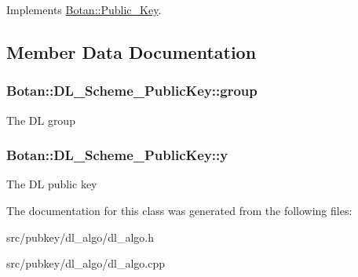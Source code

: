Implements \hyperlink{classBotan_1_1Public__Key_a9d71978d0891d73029eb016e2eb0da03}{Botan\-::\-Public\-\_\-\-Key}.



\subsection{Member Data Documentation}
\hypertarget{classBotan_1_1DL__Scheme__PublicKey_a99e61704126f6c0fcdf5475027a46500}{
\subsubsection[{group}]{ Botan\-::\-D\-L\-\_\-\-Scheme\-\_\-\-Public\-Key\-::group\hspace{0.3cm}{\ttfamily [protected]}}}\label{classBotan_1_1DL__Scheme__PublicKey_a99e61704126f6c0fcdf5475027a46500}
The D\-L group \hypertarget{classBotan_1_1DL__Scheme__PublicKey_ab4e7d9e233e3c89de236699ea5774802}{
\subsubsection[{y}]{ Botan\-::\-D\-L\-\_\-\-Scheme\-\_\-\-Public\-Key\-::y\hspace{0.3cm}{\ttfamily [protected]}}}\label{classBotan_1_1DL__Scheme__PublicKey_ab4e7d9e233e3c89de236699ea5774802}
The D\-L public key 

The documentation for this class was generated from the following files\-:\begin{DoxyCompactItemize}
\item 
src/pubkey/dl\-\_\-algo/dl\-\_\-algo.\-h\item 
src/pubkey/dl\-\_\-algo/dl\-\_\-algo.\-cpp\end{DoxyCompactItemize}

